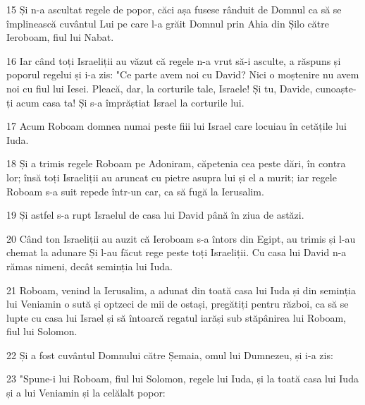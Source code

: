 \par 15 Și n-a ascultat regele de popor, căci așa fusese rânduit de Domnul ca să se împlinească cuvântul Lui pe care l-a grăit Domnul prin Ahia din Șilo către Ieroboam, fiul lui Nabat.
\par 16 Iar când toți Israeliții au văzut că regele n-a vrut să-i asculte, a răspuns și poporul regelui și i-a zis: "Ce parte avem noi cu David? Nici o moștenire nu avem noi cu fiul lui Iesei. Pleacă, dar, la corturile tale, Israele! Și tu, Davide, cunoaște-ți acum casa ta! Și s-a împrăștiat Israel la corturile lui.
\par 17 Acum Roboam domnea numai peste fiii lui Israel care locuiau în cetățile lui Iuda.
\par 18 Și a trimis regele Roboam pe Adoniram, căpetenia cea peste dări, în contra lor; însă toți Israeliții au aruncat cu pietre asupra lui și el a murit; iar regele Roboam s-a suit repede într-un car, ca să fugă la Ierusalim.
\par 19 Și astfel s-a rupt Israelul de casa lui David până în ziua de astăzi.
\par 20 Când ton Israeliții au auzit că Ieroboam s-a întors din Egipt, au trimis și l-au chemat la adunare Și l-au făcut rege peste toți Israeliții. Cu casa lui David n-a rămas nimeni, decât seminția lui Iuda.
\par 21 Roboam, venind la Ierusalim, a adunat din toată casa lui Iuda și din seminția lui Veniamin o sută și optzeci de mii de ostași, pregătiți pentru război, ca să se lupte cu casa lui Israel și să întoarcă regatul iarăși sub stăpânirea lui Roboam, fiul lui Solomon.
\par 22 Și a fost cuvântul Domnului către Șemaia, omul lui Dumnezeu, și i-a zis:
\par 23 "Spune-i lui Roboam, fiul lui Solomon, regele lui Iuda, și la toată casa lui Iuda și a lui Veniamin și la celălalt popor:

